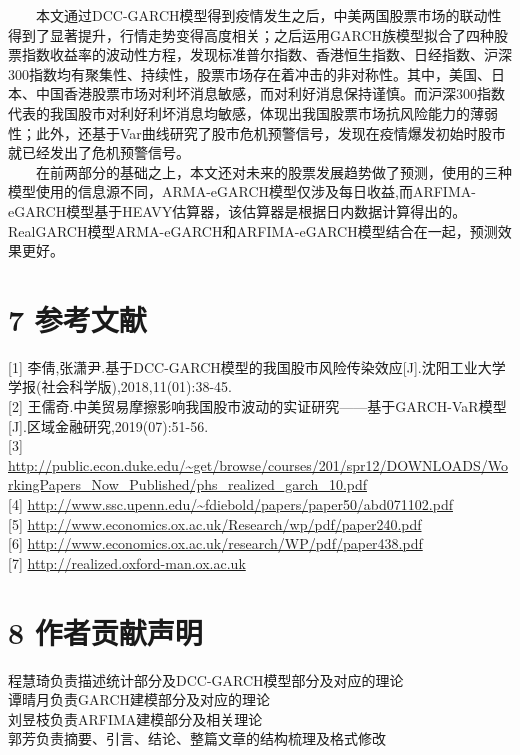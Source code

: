 \documentclass[
  11pt,
  letterpaper,
]{article}
\begin{document}
  本文通过DCC-GARCH模型得到疫情发生之后，中美两国股票市场的联动性得到了显著提升，行情走势变得高度相关；之后运用GARCH族模型拟合了四种股票指数收益率的波动性方程，发现标准普尔指数、香港恒生指数、日经指数、沪深300指数均有聚集性、持续性，股票市场存在着冲击的非对称性。其中，美国、日本、中国香港股票市场对利坏消息敏感，而对利好消息保持谨慎。而沪深300指数代表的我国股市对利好利坏消息均敏感，体现出我国股票市场抗风险能力的薄弱性；此外，还基于Var曲线研究了股市危机预警信号，发现在疫情爆发初始时股市就已经发出了危机预警信号。\\
  在前两部分的基础之上，本文还对未来的股票发展趋势做了预测，使用的三种模型使用的信息源不同，ARMA-eGARCH模型仅涉及每日收益,而ARFIMA-eGARCH模型基于HEAVY估算器，该估算器是根据日内数据计算得出的。RealGARCH模型ARMA-eGARCH和ARFIMA-eGARCH模型结合在一起，预测效果更好。

\hypertarget{ux53c2ux8003ux6587ux732e}{%
\section{7 参考文献}\label{ux53c2ux8003ux6587ux732e}}

{[}1{]}
李倩,张潇尹.基于DCC-GARCH模型的我国股市风险传染效应{[}J{]}.沈阳工业大学学报(社会科学版),2018,11(01):38-45.\\
{[}2{]}
王儒奇.中美贸易摩擦影响我国股市波动的实证研究------基于GARCH-VaR模型{[}J{]}.区域金融研究,2019(07):51-56.\\
{[}3{]}
\url{http://public.econ.duke.edu/~get/browse/courses/201/spr12/DOWNLOADS/WorkingPapers_Now_Published/phs_realized_garch_10.pdf}\\
{[}4{]}
\url{http://www.ssc.upenn.edu/~fdiebold/papers/paper50/abd071102.pdf}\\
{[}5{]}
\url{http://www.economics.ox.ac.uk/Research/wp/pdf/paper240.pdf}\\
{[}6{]}
\url{http://www.economics.ox.ac.uk/research/WP/pdf/paper438.pdf}\\
{[}7{]} \url{http://realized.oxford-man.ox.ac.uk}

\hypertarget{ux4f5cux8005ux8d21ux732eux58f0ux660e}{%
\section{8 作者贡献声明}\label{ux4f5cux8005ux8d21ux732eux58f0ux660e}}

程慧琦负责描述统计部分及DCC-GARCH模型部分及对应的理论\\
谭晴月负责GARCH建模部分及对应的理论\\
刘昱枝负责ARFIMA建模部分及相关理论\\
郭芳负责摘要、引言、结论、整篇文章的结构梳理及格式修改
\end{document}
